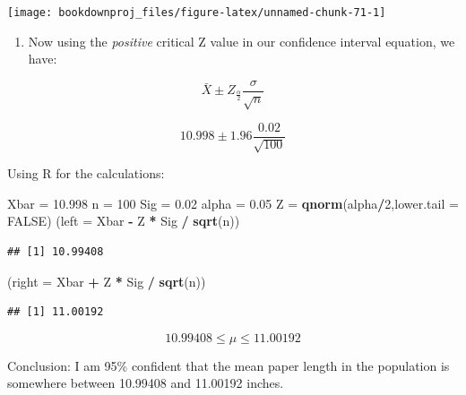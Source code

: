 \documentclass[
]{book}
\newenvironment{Shaded}{\begin{snugshade}}{\end{snugshade}}
\newcommand{\AttributeTok}[1]{\textcolor[rgb]{0.13,0.29,0.53}{#1}}
\newcommand{\ConstantTok}[1]{\textcolor[rgb]{0.56,0.35,0.01}{#1}}
\newcommand{\DecValTok}[1]{\textcolor[rgb]{0.00,0.00,0.81}{#1}}
\newcommand{\FloatTok}[1]{\textcolor[rgb]{0.00,0.00,0.81}{#1}}
\newcommand{\FunctionTok}[1]{\textcolor[rgb]{0.13,0.29,0.53}{\textbf{#1}}}
\newcommand{\NormalTok}[1]{#1}
\newcommand{\OtherTok}[1]{\textcolor[rgb]{0.56,0.35,0.01}{#1}}
\newcommand{\SpecialCharTok}[1]{\textcolor[rgb]{0.81,0.36,0.00}{\textbf{#1}}}
\providecommand{\tightlist}{%
  \setlength{\itemsep}{0pt}\setlength{\parskip}{0pt}}
\begin{document}
\begin{center}\texttt{[image: bookdownproj\_files/figure-latex/unnamed-chunk-71-1]} \end{center}

\begin{enumerate}
\def\labelenumi{\arabic{enumi}.}
\setcounter{enumi}{1}
\tightlist
\item
  Now using the \emph{positive} critical Z value in our confidence interval equation, we have:
\end{enumerate}

\[\bar{X} \pm Z_{\frac{\alpha}{2}}\frac{\sigma}{\sqrt{n}}\]

\[10.998 \pm 1.96\frac{0.02}{\sqrt{100}}\]

Using R for the calculations:

\begin{Shaded}
\begin{Highlighting}[]
\NormalTok{Xbar }\OtherTok{=} \FloatTok{10.998}
\NormalTok{n }\OtherTok{=} \DecValTok{100}
\NormalTok{Sig }\OtherTok{=} \FloatTok{0.02}
\NormalTok{alpha }\OtherTok{=} \FloatTok{0.05}
\NormalTok{Z }\OtherTok{=} \FunctionTok{qnorm}\NormalTok{(alpha}\SpecialCharTok{/}\DecValTok{2}\NormalTok{,}\AttributeTok{lower.tail =} \ConstantTok{FALSE}\NormalTok{)}
\NormalTok{(}\AttributeTok{left =}\NormalTok{ Xbar }\SpecialCharTok{{-}}\NormalTok{ Z }\SpecialCharTok{*}\NormalTok{ Sig }\SpecialCharTok{/} \FunctionTok{sqrt}\NormalTok{(n))}
\end{Highlighting}
\end{Shaded}

\begin{verbatim}
## [1] 10.99408
\end{verbatim}

\begin{Shaded}
\begin{Highlighting}[]
\NormalTok{(}\AttributeTok{right =}\NormalTok{ Xbar }\SpecialCharTok{+}\NormalTok{ Z }\SpecialCharTok{*}\NormalTok{ Sig }\SpecialCharTok{/} \FunctionTok{sqrt}\NormalTok{(n))}
\end{Highlighting}
\end{Shaded}

\begin{verbatim}
## [1] 11.00192
\end{verbatim}

\[ 10.99408 \leq \mu \leq 11.00192 \]

Conclusion: I am 95\% confident that the mean paper length in the population is somewhere between 10.99408 and 11.00192 inches.
\end{document}
